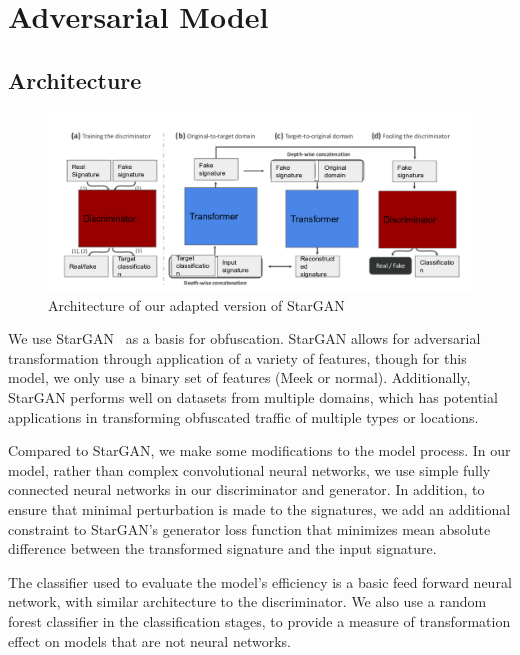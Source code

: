 \section{Adversarial Model}
\subsection{Architecture}
\begin{figure}[ht!]
    \centering
    \includegraphics[width=\textwidth]{figures/stargan-architecture}
    \caption{\label{fig:stargan-architecture} Architecture of our adapted version of StarGAN} 
\end{figure}
We use StarGAN~\cite{Choi_2018_CVPR} as a basis for obfuscation. StarGAN allows for adversarial transformation through application of a variety of features, though for this model, we only use a binary set of features (Meek or normal). Additionally, StarGAN performs well on datasets from multiple domains, which has potential applications in transforming obfuscated traffic of multiple types or locations.

Compared to StarGAN, we make some modifications to the model process. In our model, rather than complex convolutional neural networks, we use simple fully connected neural networks in our discriminator and generator. In addition, to ensure that minimal perturbation is made to the signatures, we add an additional constraint to StarGAN's generator loss function that minimizes mean absolute difference between the transformed signature and the input signature.

The classifier used to evaluate the model's efficiency is a basic feed forward neural network, with similar architecture to the discriminator. We also use a random forest classifier in the classification stages, to provide a measure of transformation effect on models that are not neural networks.

